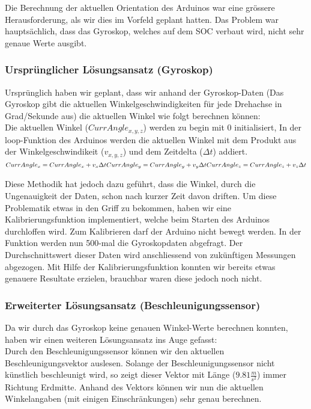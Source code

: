
Die Berechnung der aktuellen Orientation des Arduinos war eine grössere Herausforderung,
als wir dies im Vorfeld geplant hatten. Das Problem war hauptsächlich, dass das Gyroskop, welches auf dem SOC verbaut wird, nicht sehr genaue Werte ausgibt.

\subsubsection{Ursprünglicher Lösungsansatz (Gyroskop)}
Ursprünglich haben wir geplant, dass wir anhand der Gyroskop-Daten 
(Das Gyroskop gibt die aktuellen Winkelgeschwindigkeiten für jede Drehachse in Grad/Sekunde aus) 
die aktuellen Winkel wie folgt berechnen können:\\

Die aktuellen Winkel (\begin{math}CurrAngle_{x,y,z}\end{math}) werden zu begin mit 0 initialisiert, In der loop-Funktion des Arduinos werden die aktuellen Winkel mit dem Produkt aus der Winkelgeschwindikeit (\begin{math}v_{x,y,z}\end{math}) und dem Zeitdelta (\begin{math}\Delta{t}\end{math}) addiert.\\

\begin{math}
  CurrAngle_x = CurrAngle_x + v_x \Delta t  \\
  CurrAngle_y = CurrAngle_y + v_y \Delta t  \\
  CurrAngle_z = CurrAngle_z + v_z \Delta t  \\
\end{math}

Diese Methodik hat jedoch dazu geführt, dass die Winkel, durch die Ungenauigkeit der Daten, schon nach kurzer Zeit davon driften.
Um diese Problematik etwas in den Griff zu bekommen, haben wir eine Kalibrierungsfunktion implementiert, welche beim Starten des Arduinos durchloffen wird.
Zum Kalibrieren darf der Arduino nicht bewegt werden. In der Funktion werden nun 500-mal die Gyroskopdaten abgefragt.
Der Durchschnittswert dieser Daten wird anschliessend von zukünftigen Messungen abgezogen.
Mit Hilfe der Kalibrierungsfunktion konnten wir bereits etwas genauere Resultate erzielen, brauchbar waren diese jedoch  noch nicht.

\subsubsection{Erweiterter Lösungsansatz (Beschleunigungssensor)}
Da wir durch das Gyroskop keine genauen Winkel-Werte berechnen konnten, haben wir einen weiteren Lösungsansatz ins Auge gefasst:\\
Durch den Beschleunigungssensor können wir den aktuellen Beschleunigungsvektor auslesen. Solange der Beschleunigungssensor nicht künstlich beschleunigt wird, 
so zeigt dieser Vektor mit Länge (\begin{math}9.81\frac{m}{s^2}\end{math}) immer Richtung Erdmitte. Anhand des Vektors können wir nun die aktuellen Winkelangaben (mit einigen Einschränkungen) sehr genau berechnen.

